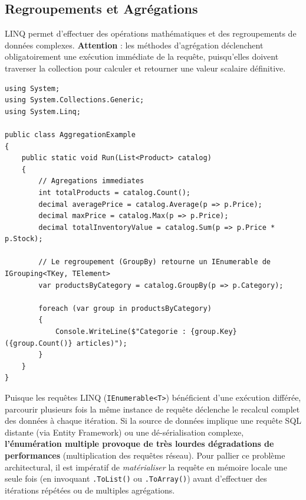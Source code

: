 \subsection{Regroupements et Agrégations}

LINQ permet d'effectuer des opérations mathématiques et des regroupements de données complexes. \textbf{Attention} : les méthodes d'agrégation déclenchent obligatoirement une exécution immédiate de la requête, puisqu'elles doivent traverser la collection pour calculer et retourner une valeur scalaire définitive.

\begin{lstlisting}[language={[Sharp]C}]
using System;
using System.Collections.Generic;
using System.Linq;

public class AggregationExample
{
    public static void Run(List<Product> catalog)
    {
        // Agregations immediates
        int totalProducts = catalog.Count();
        decimal averagePrice = catalog.Average(p => p.Price);
        decimal maxPrice = catalog.Max(p => p.Price);
        decimal totalInventoryValue = catalog.Sum(p => p.Price * p.Stock);

        // Le regroupement (GroupBy) retourne un IEnumerable de IGrouping<TKey, TElement>
        var productsByCategory = catalog.GroupBy(p => p.Category);
        
        foreach (var group in productsByCategory)
        {
            Console.WriteLine($"Categorie : {group.Key} ({group.Count()} articles)");
        }
    }
}
\end{lstlisting}

\vspace{0.5cm}

\begin{tcolorbox}[colback=red!5!white,colframe=red!75!black,title=Piège de performance : Les énumérations multiples]
Puisque les requêtes LINQ (\texttt{IEnumerable<T>}) bénéficient d'une exécution différée, parcourir plusieurs fois la même instance de requête déclenche le recalcul complet des données à chaque itération. Si la source de données implique une requête SQL distante (via Entity Framework) ou une dé-sérialisation complexe, \textbf{l'énumération multiple provoque de très lourdes dégradations de performances} (multiplication des requêtes réseau). Pour pallier ce problème architectural, il est impératif de \textit{matérialiser} la requête en mémoire locale une seule fois (en invoquant \texttt{.ToList()} ou \texttt{.ToArray()}) avant d'effectuer des itérations répétées ou de multiples agrégations.
\end{tcolorbox}
